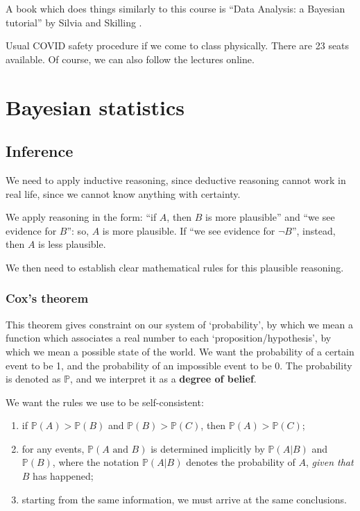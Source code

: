 \documentclass[main.tex]{subfiles}
\begin{document}
A book which does things similarly to this course is ``Data Analysis: a Bayesian tutorial'' by Silvia and Skilling \cite[]{siviaDataAnalysisBayesian2006}. 

Usual COVID safety procedure if we come to class physically.
There are 23 seats available.
Of course, we can also follow the lectures online. 

\chapter{Bayesian statistics}

\section{Inference}

We need to apply inductive reasoning, since deductive reasoning cannot work in real life, since we cannot know anything with certainty.

We apply reasoning in the form: ``if \(A\), then \(B\) is more plausible''  and ``we see evidence for \(B\)'': so, \(A\) is more plausible.
If ``we see evidence for \(\neg B\)'', instead, then \(A\) is less plausible. 

We then need to establish clear mathematical rules for this plausible reasoning. 

\subsection{Cox's theorem}

This theorem gives constraint on our system of `probability', by which we mean a function which associates a real number to each `proposition/hypothesis', by which we mean a possible state of the world.
We want the probability of a certain event to be 1, and the probability of an impossible event to be 0. The probability is denoted as \(\mathbb{P}\), and we interpret it as a \textbf{degree of belief}.

We want the rules we use to be self-consistent: 
\begin{enumerate}
    \item if \(\mathbb{P}(A) > \mathbb{P}(B)\) and \(\mathbb{P}(B) > \mathbb{P}(C)\), then \(\mathbb{P}(A) > \mathbb{P}(C)\);
    \item for any events, \(\mathbb{P}(A \text{ and } B) \) is determined implicitly by \(\mathbb{P}(A | B)\) and \( \mathbb{P}(B)\), where the notation \(\mathbb{P}(A|B)\) denotes the probability of \(A\), \emph{given that} \(B\) has happened;
    \item starting from the same information, we must arrive at the same conclusions.  
\end{enumerate}
\end{document}
